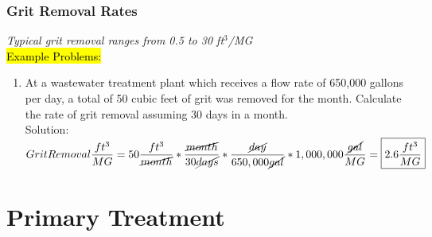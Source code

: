 \subsection{Grit Removal Rates}
\emph{Typical grit removal ranges from 0.5 to 30 ft$^3$/MG}\\
\vspace{0.3cm}
\hl{Example Problems:}\\
\begin{enumerate}[1.]
\item At a wastewater treatment plant which receives a flow rate of 650,000 gallons per day, a total of 50 cubic feet of grit was removed for the month. Calculate the rate of grit removal assuming 30 days in a month.\\
Solution:\\
$Grit Removal\dfrac{ft^3}{MG}=50\dfrac{ft^3}{ \cancel{month}}*\dfrac{\cancel{month}}{30\cancel{days}}*\dfrac{\cancel{day}}{650,000\cancel{gal}}*1,000,000\dfrac{\cancel{gal}}{MG}=\boxed{2.6\dfrac{ft^3}{MG}}$
\end{enumerate}


\chapter{Primary Treatment}

